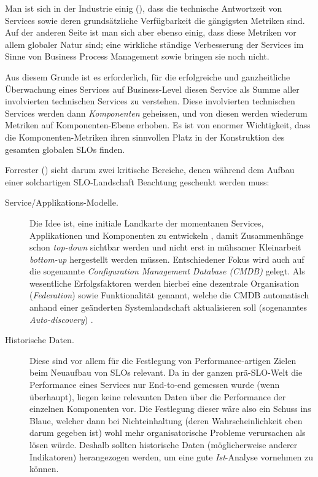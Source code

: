 \documentclass[11pt,listof=totoc]{scrreprt} %
\theoremstyle{definition}
\begin{document}
Man ist sich in der Industrie einig (\cite{forrester:slaBestPractices, EllisKauferstein200311}), dass die technische Antwortzeit von Services sowie deren grundsätzliche Verfügbarkeit die gängigsten Metriken sind. Auf der anderen Seite ist man sich aber ebenso einig, dass diese Metriken vor allem globaler Natur sind; eine wirkliche ständige Verbesserung der Services im Sinne von Business Process Management sowie \cite{EllisKauferstein200311} bringen sie noch nicht.

Aus diesem Grunde ist es erforderlich, für die erfolgreiche und ganzheitliche Überwachung eines Services auf Business-Level diesen Service als Summe aller involvierten technischen Services zu verstehen. Diese involvierten technischen Services werden dann {\em Komponenten} geheissen, und von diesen werden wiederum Metriken auf Komponenten-Ebene erhoben. Es ist von enormer Wichtigkeit, dass die Komponenten-Metriken ihren sinnvollen Platz in der Konstruktion des gesamten globalen SLOs finden.

Forrester (\cite{forrester:slaBestPractices}) sieht darum zwei kritische Bereiche, denen während dem Aufbau einer solchartigen SLO-Landschaft Beachtung geschenkt werden muss:
\begin{description}
\item[Service/Applikations-Modelle.] Die Idee ist, eine initiale Landkarte der momentanen Services, Applikationen und Komponenten zu entwickeln \cite{forrester:slaBestPractices}, damit Zusammenhänge schon {\em top-down} sichtbar werden und nicht erst in mühsamer Kleinarbeit {\em bottom-up} hergestellt werden müssen. Entschiedener Fokus wird auch auf die sogenannte {\em Configuration Management Database (CMDB)} gelegt. Als wesentliche Erfolgsfaktoren werden hierbei eine dezentrale Organisation ({\em Federation}) sowie Funktionalität genannt, welche die CMDB automatisch anhand einer geänderten Systemlandschaft aktualisieren soll (sogenanntes {\em Auto-discovery}) \cite{forrester:implementingBsm}.
\item[Historische Daten.] Diese sind vor allem für die Festlegung von Performance-artigen Zielen beim Neuaufbau von SLOs relevant. Da in der ganzen prä-SLO-Welt die Performance eines Services nur End-to-end gemessen wurde (wenn überhaupt), liegen keine relevanten Daten über die Performance der einzelnen Komponenten vor. Die Festlegung dieser wäre also ein Schuss ins Blaue, welcher dann bei Nichteinhaltung (deren Wahrscheinlichkeit eben darum gegeben ist) wohl mehr organisatorische Probleme verursachen als lösen würde. Deshalb sollten historische Daten (möglicherweise anderer Indikatoren) herangezogen werden, um eine gute {\em Ist}-Analyse vornehmen zu können.
\end{description}
\end{document}
